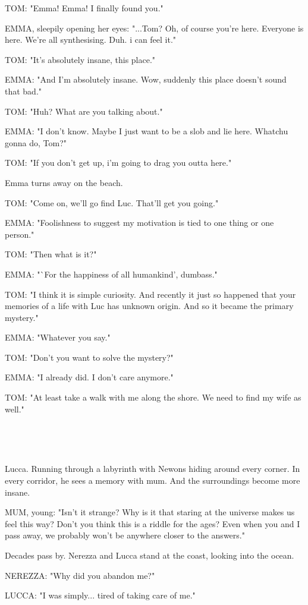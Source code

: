 \documentclass[11pt]{article}
\begin{document}
TOM: "Emma! Emma! I finally found you."

EMMA, sleepily opening her eyes: "...Tom? 
Oh, of course you're here. 
Everyone is here.
We're all synthesising. Duh.
i can feel it."

TOM: "It's absolutely insane, this place."

EMMA: "And I'm absolutely insane. Wow, suddenly this place doesn't sound that bad."

TOM: "Huh? What are you talking about."

EMMA: "I don't know.
Maybe I just want to be a slob and lie here.
Whatchu gonna do, Tom?"

TOM: "If you don't get up, i'm going to drag you outta here."

Emma turns away on the beach.

TOM: "Come on, we'll go find Luc.
That'll get you going."

EMMA: "Foolishness to suggest my motivation is tied to one thing or one person."

TOM: "Then what is it?"

EMMA: "`For the happiness of all humankind', dumbass."

TOM: "I think it is simple curiosity.
And recently it just so happened that your memories of a life with Luc has unknown origin.
And so it became the primary mystery."

EMMA: "Whatever you say."

TOM: "Don't you want to solve the mystery?"

EMMA: "I already did. I don't care anymore."

TOM: "At least take a walk with me along the shore.
We need to find my wife as well."

\ 

\ 

Lucca.
Running through a labyrinth with Newons hiding around every corner.
In every corridor, he sees a memory with mum.
And the surroundings become more insane.

MUM, young: "Isn't it strange?
Why is it that staring at the universe makes us feel this way?
Don't you think this is a riddle for the ages?
Even when you and I pass away, we probably won't be anywhere closer to the answers."

Decades pass by.
Nerezza and Lucca stand at the coast, looking into the ocean.

NEREZZA: "Why did you abandon me?"

LUCCA: "I was simply... tired of taking care of me."
\end{document}
